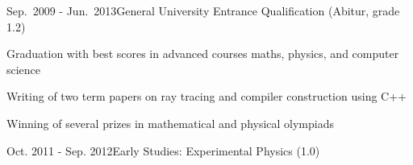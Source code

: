 \documentclass[a4paper,10pt]{cv}
\begin{document}
  \cvHead
      \begin{cvTimeItem}{Sep.~2009 - Jun.~2013}{General University Entrance Qualification (Abitur, grade 1.2)}
        \begin{cvItemize}
          \item Graduation with best scores in advanced courses maths, physics, and computer science
          \item Writing of two term papers on ray tracing and compiler construction using C++
          \item Winning of several prizes in mathematical and physical olympiads
        \end{cvItemize}
      \end{cvTimeItem}

      \begin{cvTimeItem}{Oct. 2011 - Sep. 2012}{Early Studies: Experimental Physics (1.0)}
      \end{cvTimeItem}
\end{document}
